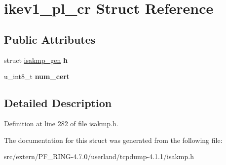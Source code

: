 \hypertarget{structikev1__pl__cr}{
\section{ikev1\_\-pl\_\-cr Struct Reference}
\label{structikev1__pl__cr}
}
\subsection*{Public Attributes}
\begin{DoxyCompactItemize}
\item 
\hypertarget{structikev1__pl__cr_a891ed4342a1e2b7d4dd226d605483e53}{
struct \hyperlink{structisakmp__gen}{isakmp\_\-gen} {\bfseries h}}
\label{structikev1__pl__cr_a891ed4342a1e2b7d4dd226d605483e53}

\item 
\hypertarget{structikev1__pl__cr_a5144cd62001d7c847162e630a62fcac6}{
u\_\-int8\_\-t {\bfseries num\_\-cert}}
\label{structikev1__pl__cr_a5144cd62001d7c847162e630a62fcac6}

\end{DoxyCompactItemize}


\subsection{Detailed Description}


Definition at line 282 of file isakmp.h.



The documentation for this struct was generated from the following file:\begin{DoxyCompactItemize}
\item 
src/extern/PF\_\-RING-\/4.7.0/userland/tcpdump-\/4.1.1/isakmp.h\end{DoxyCompactItemize}
